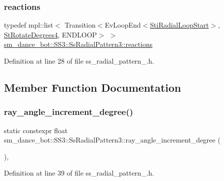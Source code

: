\subsubsection{\texorpdfstring{reactions}{reactions}}
{\footnotesize\ttfamily typedef mpl\+::list$<$ Transition$<$Ev\+Loop\+End$<$\hyperlink{structsm__dance__bot_1_1radial__motion__states_1_1StiRadialLoopStart}{Sti\+Radial\+Loop\+Start}$>$, \hyperlink{structsm__dance__bot_1_1StRotateDegrees4}{St\+Rotate\+Degrees4}, E\+N\+D\+L\+O\+OP$>$ $>$ \hyperlink{structsm__dance__bot_1_1SS3_1_1SsRadialPattern3_aa427cf1c1d77bc04e23acf4fb4bef9f1}{sm\+\_\+dance\+\_\+bot\+::\+S\+S3\+::\+Ss\+Radial\+Pattern3\+::reactions}}



Definition at line 28 of file ss\+\_\+radial\+\_\+pattern\+\_.\+h.



\subsection{Member Function Documentation}
\mbox{\label{structsm__dance__bot_1_1SS3_1_1SsRadialPattern3_a904170764306e3c9242b9cd66e44b56e}} 
\subsubsection{\texorpdfstring{ray\+\_\+angle\+\_\+increment\+\_\+degree()}{ray\_angle\_increment\_degree()}}
{\footnotesize\ttfamily static constexpr float sm\+\_\+dance\+\_\+bot\+::\+S\+S3\+::\+Ss\+Radial\+Pattern3\+::ray\+\_\+angle\+\_\+increment\+\_\+degree (\begin{DoxyParamCaption}{ }\end{DoxyParamCaption})\hspace{0.3cm}{\ttfamily [inline]}, {\ttfamily [static]}}



Definition at line 39 of file ss\+\_\+radial\+\_\+pattern\+\_.\+h.


